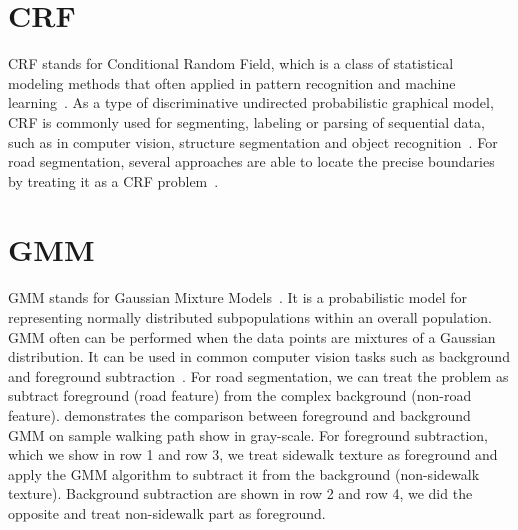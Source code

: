 \section{\ac{CRF}}
\ac{CRF} stands for Conditional Random Field, which is a class of statistical modeling methods that often applied in pattern recognition and machine learning~\cite{MAL-013}. 
As a type of discriminative undirected probabilistic graphical model, \ac{CRF} is commonly used for segmenting, labeling or parsing of sequential data, such as in computer vision, structure segmentation and object recognition~\cite{RuizSarmiento2015UPGMppA, 1315232, lafferty2001conditional}. 
For road segmentation, several approaches are able to locate the precise boundaries by treating it as a \ac{CRF} problem~\cite{ActiveContou09, Achanta:149300}. 

\section{\ac{GMM}}

\ac{GMM} stands for Gaussian Mixture Models~\cite{sridharan2014gaussian}.
It is a probabilistic model for representing normally distributed subpopulations within an overall population.
\ac{GMM} often can be performed when the data points are mixtures of a Gaussian distribution. 
It can be used in common computer vision tasks such as background and foreground subtraction~\cite{1333992}. 
For road segmentation, we can treat the problem as subtract foreground (road feature) from the complex background (non-road feature). 
 demonstrates the comparison between foreground and background \ac{GMM} on sample walking path show in gray-scale. 
For foreground subtraction, which we show in row 1 and row 3, we treat sidewalk texture as foreground and apply the \ac{GMM} algorithm to subtract it from the background (non-sidewalk texture). 
Background subtraction are shown in row 2 and row 4, we did the opposite and treat non-sidewalk part as foreground. 

